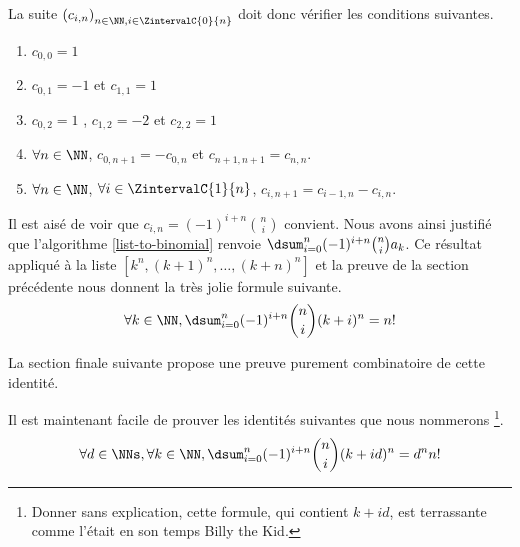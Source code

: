 La suite $\left(  c_{i,n} \right)_{n \in \NN , i \in \ZintervalC{0}{n}}$ doit donc vérifier les conditions suivantes.

\begin{enumerate}
	\item $c_{0,0} = 1$
	
	\item $c_{0,1} = -1$ et $c_{1, 1} = 1$

	\item $c_{0,2} = 1$ , $c_{1, 2} = -2$ et $c_{2, 2} = 1$

	\item $\forall n \in \NN$, $c_{0,n+1} = - c_{0,n}$ et $c_{n+1,n+1} = c_{n,n}$.

	\item $\forall n \in \NN$, $\forall i \in \ZintervalC{1}{n}$, $c_{i,n+1} = c_{i-1,n} - c_{i,n}$.
\end{enumerate}


Il est aisé de voir que $c_{i,n} = (-1)^{i+n} \binom{n}{i}$ convient. Nous avons ainsi justifié que l'algorithme \ref{list-to-binomial} renvoie $\dsum_{i=0}^{n} (-1)^{i+n} \binom{n}{i} a_k$.
Ce résultat appliqué à la liste $[ k^n , (k+1)^n , \dots , (k+n)^n ]$ et la preuve de la section précédente nous donnent la très jolie formule suivante.
\[ \forall k \in \NN, \dsum_{i=0}^{n} (-1)^{i+n} \binom{n}{i} (k+i)^n = n! \]


La section finale suivante propose une preuve purement combinatoire de cette identité.


\begin{remark}
	Il est maintenant facile de prouver les identités suivantes que nous nommerons 
	\footnote{
		Donner sans explication, cette formule, qui contient $k+id$, est terrassante comme l'était en son temps Billy the Kid.
	}.
	\[ \forall d \in \NNs, \forall k \in \NN, \dsum_{i=0}^{n} (-1)^{i+n} \binom{n}{i} (k+id)^n = d^n n! \]
\end{remark}

